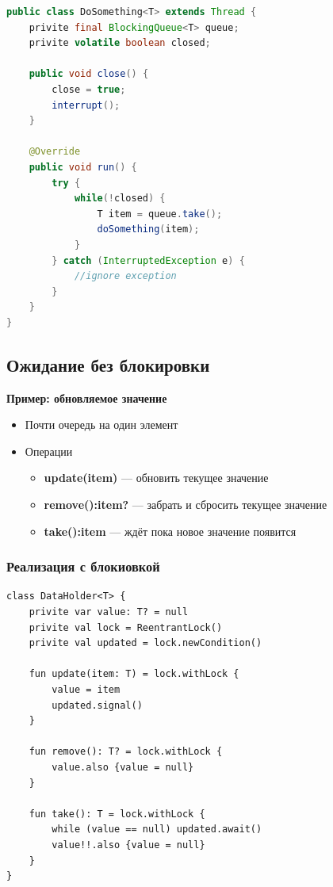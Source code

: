 \documentclass[10pt,a4paper,oneside,titlepage]{article}
\theoremstyle{plain}
\theoremstyle{defenition}
\begin{document}
\begin{lstlisting}[language=Java]
public class DoSomething<T> extends Thread {
    privite final BlockingQueue<T> queue;
    privite volatile boolean closed;
    
    public void close() {
        close = true;
        interrupt();
    }
    
    @Override
    public void run() {
        try {
            while(!closed) {
                T item = queue.take();
                doSomething(item);
            }
        } catch (InterruptedException e) {
            //ignore exception
        }
    }
}
\end{lstlisting}

\subsection{Ожидание без блокировки}

{\bfseries Пример: обновляемое значение}
\begin{itemize}
	\item Почти очередь на один элемент
	\item Операции
	\begin{itemize}
		\item {\bfseries update(item)} --- обновить текущее значение
		\item {\bfseries remove():item?} --- забрать и сбросить текущее значение
		\item {\bfseries take():item} --- ждёт пока новое значение появится
	\end{itemize}
\end{itemize}

\subsubsection{Реализация с блокиовкой}

\begin{lstlisting}
class DataHolder<T> {
    privite var value: T? = null
    privite val lock = ReentrantLock()
    privite val updated = lock.newCondition()
    
    fun update(item: T) = lock.withLock {
        value = item
        updated.signal()
    }
    
    fun remove(): T? = lock.withLock {
        value.also {value = null}
    }
    
    fun take(): T = lock.withLock {
        while (value == null) updated.await()
        value!!.also {value = null}
    }
}
\end{lstlisting}
\end{document}
